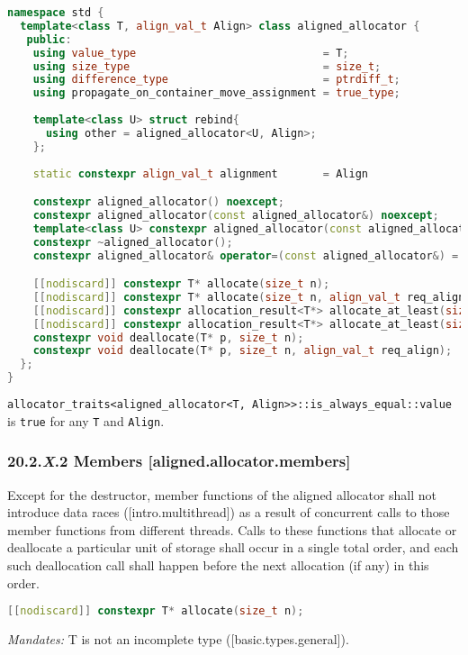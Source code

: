 \documentclass[11pt]{article}
\begin{document}
\begin{lstlisting}[language=C++, basicstyle=\small]
namespace std {
  template<class T, align_val_t Align> class aligned_allocator {
   public:
    using value_type                             = T;
    using size_type                              = size_t;
    using difference_type                        = ptrdiff_t;
    using propagate_on_container_move_assignment = true_type;
    
    template<class U> struct rebind{
      using other = aligned_allocator<U, Align>;
    };
    
    static constexpr align_val_t alignment       = Align

    constexpr aligned_allocator() noexcept;
    constexpr aligned_allocator(const aligned_allocator&) noexcept;
    template<class U> constexpr aligned_allocator(const aligned_allocator<U, Align>&) noexcept;
    constexpr ~aligned_allocator();
    constexpr aligned_allocator& operator=(const aligned_allocator&) = default;

    [[nodiscard]] constexpr T* allocate(size_t n);
    [[nodiscard]] constexpr T* allocate(size_t n, align_val_t req_align);
    [[nodiscard]] constexpr allocation_result<T*> allocate_at_least(size_t n);    
    [[nodiscard]] constexpr allocation_result<T*> allocate_at_least(size_t n, align_val_t req_align);
    constexpr void deallocate(T* p, size_t n);
    constexpr void deallocate(T* p, size_t n, align_val_t req_align);
  };
}

\end{lstlisting}
\noindent
\texttt{allocator\_traits<aligned\_allocator<T, Align>>::is\_always\_equal::value} is \texttt{true} for any \texttt{T} and \texttt{Align}.

\subsubsection{20.2.\textit{X}.2	Members	[aligned.allocator.members]}

Except for the destructor, member functions of the aligned allocator shall not introduce data races ([intro.multithread]) as a result of concurrent calls to those member functions from different threads.
Calls to these functions that allocate or deallocate a particular unit of storage shall occur in a single total order, and each such deallocation call shall happen before the next allocation (if any) in this order.

\begin{lstlisting}[language=C++, basicstyle=\small]
[[nodiscard]] constexpr T* allocate(size_t n);
\end{lstlisting}
\noindent
\hangindent=1.05cm\hspace{1cm}\textit{Mandates:} T is not an incomplete type ([basic.types.general]).
\end{document}
